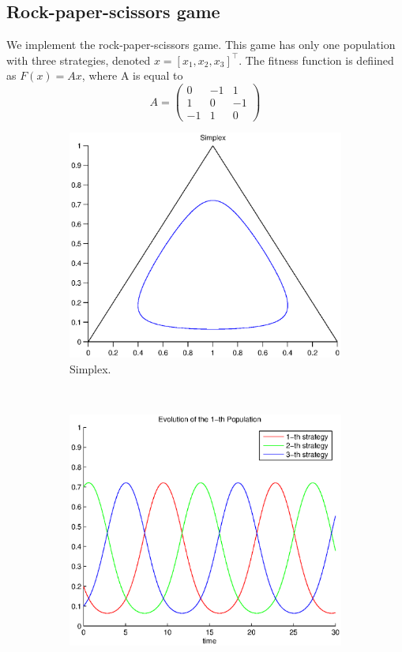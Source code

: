 \documentclass[a4paper,10pt]{article}
\begin{document}
\subsection{Rock-paper-scissors game}
We implement the rock-paper-scissors game. This game has only one population with three strategies, denoted $x = [x_1, x_2, x_3]^\top$. The fitness function is defiined as $F(x)=Ax$, where A is equal to 
\begin{equation}
  A = \begin{pmatrix}
  0  & -1 &  1 \\
  1  &  0 & -1 \\
  -1 &  1 & 0
  \end{pmatrix}
\end{equation}


\begin{figure}
  \centering
  \begin{subfigure}[b]{0.45\textwidth}
	  \includegraphics[width=\textwidth]{./images/test1_simplex_rd.eps}
	  \caption{Simplex.}
	  \label{fig:test1_simplex_rd}
  \end{subfigure}
  ~ 
  \begin{subfigure}[b]{0.45\textwidth}
	  \includegraphics[width=\textwidth]{./images/test1_ev_rd.eps}

\end{subfigure}
\end{figure}
\end{document}
